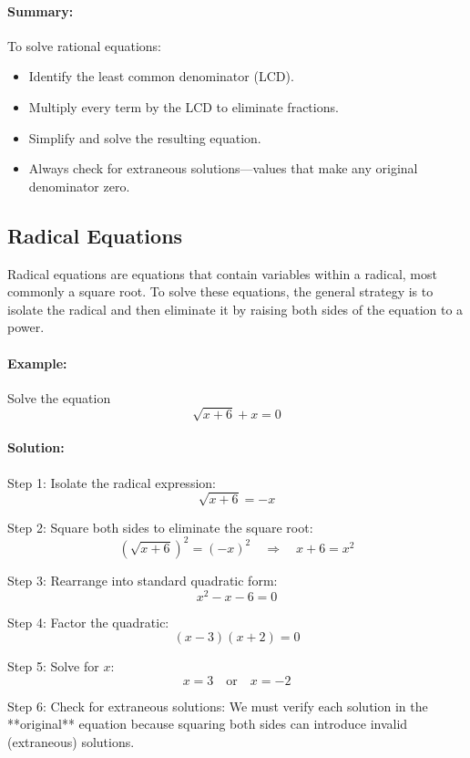 \documentclass[11pt]{article}
\begin{document}
\paragraph{Summary:} To solve rational equations:
\begin{itemize}
    \item Identify the least common denominator (LCD).
    \item Multiply every term by the LCD to eliminate fractions.
    \item Simplify and solve the resulting equation.
    \item Always check for extraneous solutions—values that make any original denominator zero.
\end{itemize}

\subsection{Radical Equations}

Radical equations are equations that contain variables within a radical, most commonly a square root. To solve these equations, the general strategy is to isolate the radical and then eliminate it by raising both sides of the equation to a power.

\paragraph{Example:} Solve the equation
\[
\sqrt{x + 6} + x = 0
\]

\paragraph{Solution:}

Step 1: Isolate the radical expression:
\[
\sqrt{x + 6} = -x
\]

Step 2: Square both sides to eliminate the square root:
\[
(\sqrt{x + 6})^2 = (-x)^2 \quad \Rightarrow \quad x + 6 = x^2
\]

Step 3: Rearrange into standard quadratic form:
\[
x^2 - x - 6 = 0
\]

Step 4: Factor the quadratic:
\[
(x - 3)(x + 2) = 0
\]

Step 5: Solve for \( x \):
\[
x = 3 \quad \text{or} \quad x = -2
\]

Step 6: Check for extraneous solutions:
We must verify each solution in the **original** equation because squaring both sides can introduce invalid (extraneous) solutions.
\end{document}
